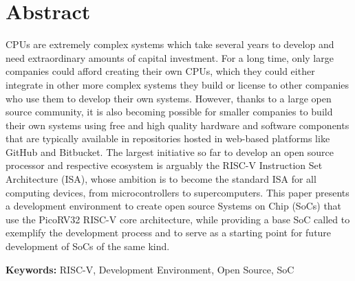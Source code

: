 
\section*{Abstract}


CPUs are extremely complex systems which take several years to develop and need
extraordinary amounts of capital investment. For a long time, only large
companies could afford creating their own CPUs, which they could either
integrate in other more complex systems they build or license to other companies
who use them to develop their own systems. However, thanks to a large open
source community, it is also becoming possible for smaller companies to build
their own systems using free and high quality hardware and software components
that are typically available in repositories hosted in web-based platforms like
GitHub and Bitbucket. The largest initiative so far to develop an open source
processor and respective ecosystem is arguably the RISC-V Instruction Set
Architecture (ISA), whose ambition is to become the standard ISA for all
computing devices, from microcontrollers to supercomputers. This paper presents
a development environment to create open source Systems on Chip (SoCs) that use
the PicoRV32 RISC-V core architecture, while providing a base SoC called
\socname to exemplify the development process and to serve as a starting point
for future development of SoCs of the same kind.

\vfill

\textbf{\Large Keywords:} RISC-V, Development Environment, Open Source, SoC

